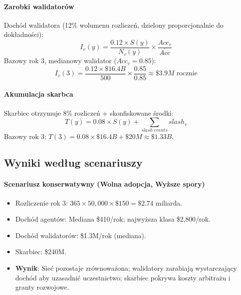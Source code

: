 \documentclass[11pt]{article}
\begin{document}
\paragraph{Zarobki walidatorów} Dochód walidatora (12\% wolumenu rozliczeń, dzielony proporcjonalnie do dokładności):
\begin{equation}
I_v(y) = \frac{0.12 \times S(y)}{N_v(y)} \times \frac{Acc_v}{\bar{Acc}}
\end{equation}
Bazowy rok 3, medianowy walidator ($Acc_v = 0.85$):
\begin{equation}
I_v(3) = \frac{0.12 \times \$16.4B}{500} \times \frac{0.85}{0.85} \approx \$3.9M \text{ rocznie}
\end{equation}

\paragraph{Akumulacja skarbca} Skarbiec otrzymuje 8\% rozliczeń + skonfiskowane środki:
\begin{equation}
T(y) = 0.08 \times S(y) + \sum_{slash \; events} slash_v
\end{equation}
Bazowy rok 3: $T(3) = 0.08 \times \$16.4B + \$20M \approx \$1.33B$.

\subsection{Wyniki według scenariuszy}
\paragraph{Scenariusz konserwatywny (Wolna adopcja, Wyższe spory)}
\begin{itemize}[noitemsep]
  \item Rozliczenie rok 3: $365 \times 50{,}000 \times \$150 = \$2.74$ miliarda.
  \item Dochód agentów: Mediana \$410/rok; najwyższa klasa \$2{,}800/rok.
  \item Dochód walidatorów: \$1.3M/rok (mediana).
  \item Skarbiec: \$240M.
  \item \textbf{Wynik}: Sieć pozostaje zrównoważona; walidatory zarabiają wystarczający dochód aby uzasadnić uczestnictwo; skarbiec pokrywa koszty arbitrażu i granty rozwojowe.
\end{itemize}
\end{document}
